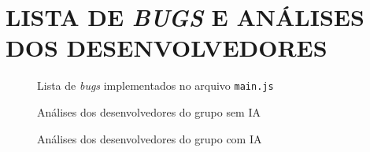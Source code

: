 \documentclass[english,brazilian]{UNISINOSartigo} %
\begin{document}


\section{LISTA DE \textit{BUGS} E ANÁLISES DOS DESENVOLVEDORES}

\renewcommand{\thefigure}{H.\arabic{figure}}
\setcounter{figure}{0}

\begin{figure}[ht]
    \caption{Lista de \textit{bugs} implementados no arquivo \texttt{main.js}}
    \label{fig:bugs}
    \centering
    \footnotesize
    \begin{minipage}{.9\textwidth}
        \centering
    \end{minipage}
\end{figure}
\FloatBarrier

\begin{figure}[ht]
    \caption{Análises dos desenvolvedores do grupo sem IA}
    \label{fig:resultados_bugs_sem_ia}
    \centering
    \footnotesize
    \begin{minipage}{.9\textwidth}
        \centering
    \end{minipage}
\end{figure}
\FloatBarrier

\begin{figure}[ht]
    \caption{Análises dos desenvolvedores do grupo com IA}
    \label{fig:resultados_bugs_com_ia}
    \centering
    \footnotesize
    \begin{minipage}{.9\textwidth}
        \centering
    \end{minipage}
\end{figure}
\FloatBarrier
\end{document}
